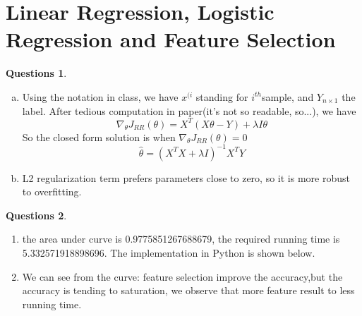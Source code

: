 \documentclass[a4paper,11pt]{article}
\theoremstyle{definition}
\newtheorem{quests}{Questions}
\begin{document}
\section{Linear Regression, Logistic Regression and Feature Selection}
\begin{quests}
\leavevmode
\\
\begin{enumerate}[(a)]
\item Using the notation in class, we have $x^{(i}$ standing for $i^{th}$sample, and $Y_{n \times 1}$ the label. After tedious computation in paper(it's not so readable, so...), we have 
$$\nabla_{\theta}J_{RR}(\theta)=X^T(X\theta-Y)+\lambda I\theta$$
So the closed form solution is when $\nabla_{\theta}J_{RR}(\theta)=0$
$$\hat{\theta} = (X^{T}X + \lambda I)^{-1}X^{T}Y$$

\item L2 regularization term prefers parameters close to zero, so it is more robust to overfitting.
\end{enumerate}
\end{quests}
\newpage

\begin{quests}
\begin{enumerate}[1]
\leavevmode
\\
\item the area under curve is 0.9775851267688679, the required running time is 5.332571918898696. The implementation in Python is shown below.\\

\item We can see from the curve: feature selection improve the accuracy,but the accuracy is tending to saturation, we observe that more feature result to less running time.
\begin{center}
\end{center}
\end{enumerate}
\end{quests}
\end{document}
